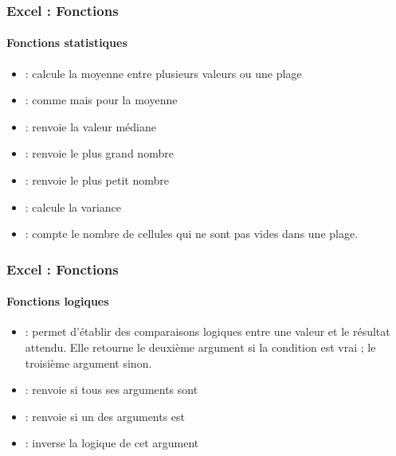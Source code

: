 \documentclass[xcolor=table, usenames,dvipsnames]{beamer}
\begin{document}
\begin{frame}
\frametitle{Excel : Fonctions}
\framesubtitle{Fonctions statistiques}

\begin{minipage}{0.69\textwidth}
	\begin{itemize}
		\item {} : calcule la moyenne entre plusieurs valeurs ou une plage
		\item {} : comme  mais pour la moyenne
		\item {} : renvoie la valeur médiane
		\item {} : renvoie le plus grand nombre
		\item {} : renvoie le plus petit nombre
		\item {} : calcule la variance
		\item {} : compte le nombre de cellules qui ne sont pas vides dans une plage.
	\end{itemize}
\end{minipage}
%
\begin{minipage}{0.3\textwidth} 
	
	
	
\end{minipage}

\end{frame}

\begin{frame}
\frametitle{Excel : Fonctions}
\framesubtitle{Fonctions logiques}

\begin{minipage}{0.69\textwidth}
	\begin{itemize}
		\item {} : permet d'établir des comparaisons logiques entre une valeur et le résultat attendu. Elle retourne le deuxième argument si la condition est vrai ; le troisième argument sinon.
		\item {} : renvoie  si tous ses arguments sont 
		\item {} : renvoie  si un des arguments est 
		\item {} : inverse la logique de cet argument
	\end{itemize}
\end{minipage}
%
\begin{minipage}{0.3\textwidth} 
	
	
	
\end{minipage}

\end{frame}
\end{document}
